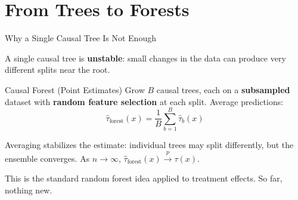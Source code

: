 \documentclass[aspectratio=169, 11pt, handout]{beamer}
\begin{document}
 
 
\section{From Trees to Forests}
 
\begin{frame}{Why a Single Causal Tree Is Not Enough}
 
A single causal tree is \textbf{unstable}: small changes in the data can produce very different splits near the root.
 
\pause
\bigskip
 
\begin{block}{Causal Forest (Point Estimates)}
Grow $B$ causal trees, each on a \textbf{subsampled} dataset with \textbf{random feature selection} at each split. Average predictions:
\[
\hat{\tau}_{\text{forest}}(x) = \frac{1}{B}\sum_{b=1}^{B} \hat{\tau}_b(x)
\]
\end{block}
 
\pause
\bigskip
 
Averaging stabilizes the estimate: individual trees may split differently, but the ensemble converges. As $n \to \infty$, $\hat{\tau}_{\text{forest}}(x) \xrightarrow{p} \tau(x)$.
 
\pause
\bigskip
 
This is the standard random forest idea applied to treatment effects. So far, nothing new.
 
\end{frame}
 
\end{document}
